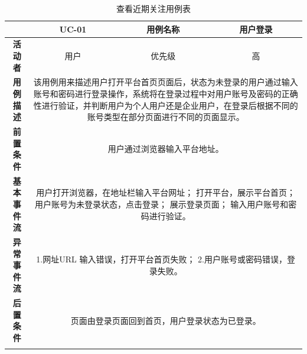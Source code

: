 \begin{longtable}[c]{c|ccc}
	\caption{查看近期关注用例表}
	\label{tab:tab8}\\
	\shline
	\multicolumn{1}{c|}{\textbf{用例编号}} & \multicolumn{1}{c|}{UC-01} & \multicolumn{1}{c|}{用例名称} &  用户登录\\ \hline
	\endhead
	\multicolumn{1}{c|}{\textbf{活动者}} & \multicolumn{1}{c|}{用户} & \multicolumn{1}{c|}{优先级} &高  \\ \hline
	\textbf{用例描述} & \multicolumn{3}{p{12cm}}{该用例用来描述用户打开平台首页页面后，状态为未登录的用户通过输入账号和密码进行登录操作，系统将在登录过程中对用户账号及密码的正确性进行验证，并判断用户为个人用户还是企业用户，在登录后根据不同的账号类型在部分页面进行不同的页面显示。} \\ \hline
	\textbf{前置条件}& \multicolumn{3}{p{12cm}}{用户通过浏览器输入平台地址。} \\ \hline
	\textbf{基本事件流}& \multicolumn{3}{p{12cm}}{用户打开浏览器，在地址栏输入平台网址；\newline
		打开平台，展示平台首页；\newline
		用户账号为未登录状态，点击登录；\newline
		展示登录页面；\newline
		输入用户账号和密码进行验证。} \\ \hline
	\textbf{异常事件流}& \multicolumn{3}{p{12cm}}{1.网址URL 输入错误，打开平台首页失败；\newline
		2.用户账号或密码错误，登录失败。
	} \\ \hline
	\textbf{后置条件}& \multicolumn{3}{p{12cm}}{页面由登录页面回到首页，用户登录状态为已登录。} \\ \shline
\end{longtable}


